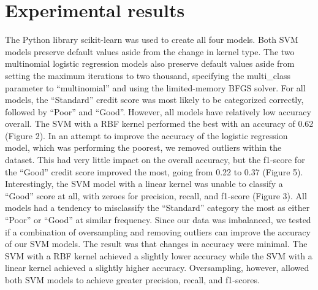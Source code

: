 \documentclass[11pt, twocolumn]{article}
\begin{document}
\section*{Experimental results}
The Python library scikit-learn was used to create all four models. Both SVM models preserve default values aside from the change
in kernel type. The two multinomial logistic regression models also preserve default values aside from setting the maximum iterations
to two thousand, specifying the multi\_class parameter to ``multinomial'' and using the limited-memory BFGS solver.
For all models, the ``Standard'' credit score was most likely to be categorized correctly, followed by ``Poor'' and ``Good''. 
However, all models have relatively low accuracy overall. The SVM with a RBF kernel performed the best with an
accuracy of 0.62 (Figure 2). \vspace{5mm}\newline
In an attempt to improve the accuracy of the logistic regression model, which was performing the poorest, we removed outliers within the dataset.
This had very little impact on the overall accuracy, but the f1-score for the ``Good'' credit score improved the most, going from 0.22 to 0.37 (Figure 5).
Interestingly, the SVM model with a linear kernel was unable to classify a ``Good'' score at all, with zeroes for precision, 
recall, and f1-score (Figure 3). All models had a tendency to misclassify the ``Standard'' category the most as either ``Poor'' or 
``Good'' at similar frequency.\vspace{5mm}\newline
Since our data was imbalanced, we tested if a combination of oversampling and removing outliers can improve the accuracy of our SVM models. 
The result was that changes in accuracy were minimal. The SVM with a RBF kernel achieved a slightly lower accuracy while the SVM with a linear kernel
achieved a slightly higher accuracy. Oversampling, however, allowed both SVM models to achieve greater precision, recall,
and f1-scores.
\end{document}
